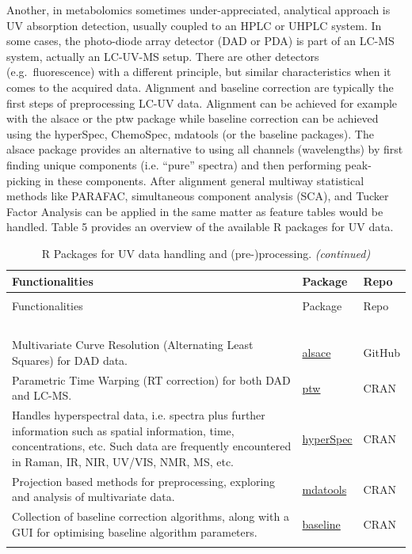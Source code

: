 \documentclass[]{article}
\begin{document}
Another, in metabolomics sometimes under-appreciated, analytical approach is UV absorption detection, usually coupled to an HPLC or UHPLC system. In some cases, the photo-diode array detector (DAD or PDA) is part of an LC-MS system, actually an LC-UV-MS setup. There are other detectors (e.g.~fluorescence) with a different principle, but similar characteristics when it comes to the acquired data. Alignment and baseline correction are typically the first steps of preprocessing LC-UV data. Alignment can be achieved for example with the alsace or the ptw package while baseline correction can be achieved using the hyperSpec, ChemoSpec, mdatools (or the baseline packages). The alsace package provides an alternative to using all channels (wavelengths) by first finding unique components (i.e. ``pure'' spectra) and then performing peak-picking in these components. After alignment general multiway statistical methods like PARAFAC, simultaneous component analysis (SCA), and Tucker Factor Analysis can be applied in the same matter as feature tables would be handled. Table 5 provides an overview of the available R packages for UV data.

\begin{longtable}{>{\raggedright\arraybackslash}p{30em}>{\raggedright\arraybackslash}p{10em}>{\raggedright\arraybackslash}p{3em}}
\caption{\label{tab:tab5}R Packages for UV data handling and (pre-)processing.}\\
\toprule
Functionalities & Package & Repo\\
\midrule
\endfirsthead
\caption[]{\label{tab:tab5}R Packages for UV data handling and (pre-)processing. \textit{(continued)}}\\
\toprule
Functionalities & Package & Repo\\
\midrule
\endhead
\
\endfoot
\bottomrule
\endlastfoot
\rowcolor{gray!6}  \addlinespace[0.3em]
\multicolumn{3}{l}{\textbf{DAD}}\\
Multivariate Curve Resolution (Alternating Least Squares) for DAD data. & \href{https://github.com/rwehrens/alsace}{alsace} & GitHub\\
Parametric Time Warping (RT correction) for both DAD and LC-MS. & \href{https://cran.r-project.org/package=ptw}{ptw} & CRAN\\
\rowcolor{gray!6}  Handles hyperspectral data, i.e. spectra plus further information such as spatial information, time, concentrations, etc. Such data are frequently encountered in Raman, IR, NIR, UV/VIS, NMR, MS, etc. & \href{https://cran.r-project.org/package=ChemoSpec}{hyperSpec} & CRAN\\
Projection based methods for preprocessing, exploring and analysis of multivariate data. & \href{https://cran.r-project.org/package=mdatools}{mdatools} & CRAN\\
\rowcolor{gray!6}  Collection of baseline correction algorithms, along with a GUI for optimising baseline algorithm parameters. & \href{https://cran.r-project.org/package=baseline}{baseline} & CRAN\\*
\end{longtable}
\end{document}
